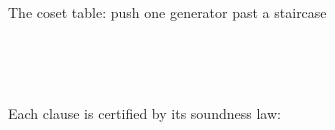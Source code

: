 \begin{frame}{The coset table: push one generator past a staircase}
\begin{columns}[c]
\begin{column}{0.66\textwidth}
\begin{code}
\AgdaSpace{}%
\AgdaSymbol{=}\AgdaSpace{}%
\AgdaSpace{}%
\AgdaOperator{\AgdaInductiveConstructor{,}}\AgdaSpace{}%
\AgdaSpace{}%
\AgdaSpace{}%
%
\>[36]\<%
\\
\>[0]\AgdaSpace{}%
\AgdaSpace{}%
\AgdaSymbol{(}\AgdaSpace{}%
\AgdaSymbol{)}\AgdaSpace{}%
\AgdaSymbol{=}\AgdaSpace{}%
\AgdaOperator{\AgdaInductiveConstructor{[}}\AgdaSpace{}%
\AgdaSpace{}%
\AgdaOperator{\AgdaInductiveConstructor{]ʷ}}\AgdaSpace{}%
\AgdaOperator{\AgdaInductiveConstructor{,}}\AgdaSpace{}%
%
\>[36]\<%
\\
\>[0]\AgdaSpace{}%
\AgdaSymbol{(}\AgdaSpace{}%
\AgdaSymbol{)}\AgdaSpace{}%
\AgdaSymbol{(}\AgdaSpace{}%
\AgdaSymbol{)}\AgdaSpace{}%
\AgdaSymbol{=}\AgdaSpace{}%
\AgdaSpace{}%
\AgdaSymbol{(}\AgdaSpace{}%
\AgdaSpace{}%
\AgdaSymbol{)}\AgdaSpace{}%
\AgdaSpace{}%
\AgdaOperator{\AgdaInductiveConstructor{,}}\AgdaSpace{}%
\AgdaSpace{}%
\AgdaSymbol{(}\AgdaSpace{}%
\AgdaSymbol{(}\AgdaSpace{}%
\AgdaSpace{}%
\AgdaSymbol{))}\<%
\end{code}
\vspace{2pt}
{\small Each clause is certified by its \alert{soundness law}:}
\begin{code}%
\>[0]\AgdaSpace{}%
\AgdaSymbol{:}%
\>[405I]\AgdaSpace{}%
\AgdaSpace{}%
\AgdaSpace{}%
\AgdaSpace{}%
\AgdaSpace{}%
\AgdaSymbol{(}\AgdaSpace{}%
\AgdaOperator{\AgdaInductiveConstructor{,}}\AgdaSpace{}%
\AgdaSymbol{)}\AgdaSpace{}%
\AgdaSymbol{=}\AgdaSpace{}%
\AgdaSpace{}%
\AgdaSpace{}%
\AgdaSpace{}%
\<%
\\
\>[.][@{}l@{}]\<[405I]%
\>[13]\AgdaOperator{\AgdaFunction{[}}\AgdaSpace{}%
\AgdaSpace{}%
\AgdaOperator{\AgdaFunction{]ᶜ}}\AgdaSpace{}%
\AgdaSpace{}%

\end{code}
\end{column}
\end{columns}
\end{frame}
